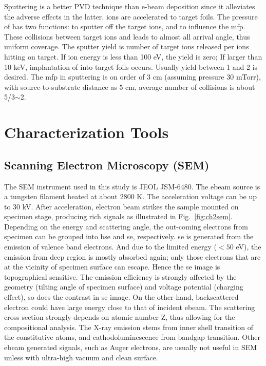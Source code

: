 Sputtering is a better PVD technique than e-beam deposition since it alleviates the adverse effects in the latter.  ions are accelerated to target foils. The pressure of  has two functions: to sputter off the target ions, and to influence the \gls{mfp}. These collisions between target ions and  leads to almost all arrival angle, thus uniform coverage. The sputter yield is number of target ions released per ions hitting on target. If  ion energy is less than 100 eV, the yield is zero; If larger than 10 keV, implantation of  into target foils occurs. Usually yield between 1 and 2 is desired. The \gls{mfp} in sputtering is on order of 3 cm (assuming pressure 30 mTorr), with source-to-substrate distance as 5 cm, average number of collisions is about 5/3$\sim$2. 

\section{Characterization Tools}
\subsection{Scanning Electron Microscopy (SEM)}\label{sec:sem}

The SEM instrument used in this study is JEOL JSM-6480. The \gls{ebeam} source is a tungsten filament heated at about 2800 K. The acceleration voltage can be up to 30 kV. After acceleration, electron beam strikes the sample mounted on specimen stage, producing rich signals as illustrated in Fig.~\ref{fig:ch2sem}. Depending on the energy and scattering angle, the out-coming electrons from specimen can be grouped into \gls{bse} and \gls{se}, respectively. \gls{se} is generated from the emission of valence band electrons. And due to the limited energy ($<50$ eV), the emission from deep region is mostly absorbed again; only those electrons that are at the vicinity of specimen surface can escape. Hence the \gls{se} image is topographical sensitive. The emission efficiency is strongly affected by the geometry (tilting angle of specimen surface) and voltage potential (charging effect), so does the contrast in \gls{se} image. On the other hand, backscattered electron could have large energy close to that of incident \gls{ebeam}. The scattering cross section strongly depends on atomic number Z, thus allowing for the compositional analysis. The X-ray emission stems from inner shell transition of the constitutive atoms, and cathodoluminescence from bandgap transition. Other \gls{ebeam} generated signals, such as Auger electrons, are usually not useful in SEM unless with ultra-high vacuum and clean surface.

